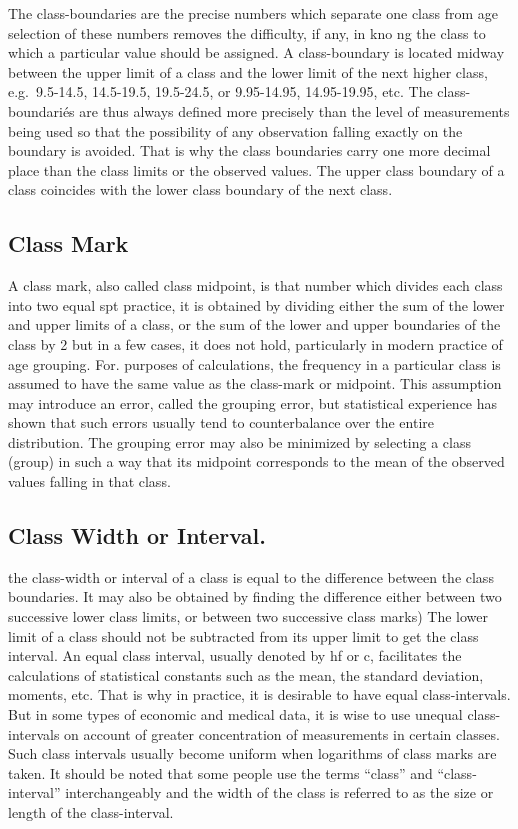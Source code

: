 \documentclass[]{article}
\begin{document}
The class-boundaries are the precise numbers which separate one class
from age selection of these numbers removes the difficulty, if any, in
kno ng the class to which a particular value should be assigned. A
class-boundary is located midway between the upper limit of a class and
the lower limit of the next higher class, e.g.~9.5-14.5, 14.5-19.5,
19.5-24.5, or 9.95-14.95, 14.95-19.95, etc. The class-boundariés are
thus always defined more precisely than the level of measurements being
used so that the possibility of any observation falling exactly on the
boundary is avoided. That is why the class boundaries carry one more
decimal place than the class limits or the observed values. The upper
class boundary of a class coincides with the lower class boundary of the
next class.

\hypertarget{class-mark}{%
\subsection{Class Mark}\label{class-mark}}

A class mark, also called class midpoint, is that number which divides
each class into two equal spt practice, it is obtained by dividing
either the sum of the lower and upper limits of a class, or the sum of
the lower and upper boundaries of the class by 2 but in a few cases, it
does not hold, particularly in modern practice of age grouping. For.
purposes of calculations, the frequency in a particular class is assumed
to have the same value as the class-mark or midpoint. This assumption
may introduce an error, called the grouping error, but statistical
experience has shown that such errors usually tend to counterbalance
over the entire distribution. The grouping error may also be minimized
by selecting a class (group) in such a way that its midpoint corresponds
to the mean of the observed values falling in that class.

\hypertarget{class-width-or-interval.}{%
\subsection{Class Width or Interval.}\label{class-width-or-interval.}}

the class-width or interval of a class is equal to the difference
between the class boundaries. It may also be obtained by finding the
difference either between two successive lower class limits, or between
two successive class marks) The lower limit of a class should not be
subtracted from its upper limit to get the class interval. An equal
class interval, usually denoted by hf or c, facilitates the calculations
of statistical constants such as the mean, the standard deviation,
moments, etc. That is why in practice, it is desirable to have equal
class-intervals. But in some types of economic and medical data, it is
wise to use unequal class-intervals on account of greater concentration
of measurements in certain classes. Such class intervals usually become
uniform when logarithms of class marks are taken. It should be noted
that some people use the terms ``class'' and ``class- interval''
interchangeably and the width of the class is referred to as the size or
length of the class-interval.
\end{document}
